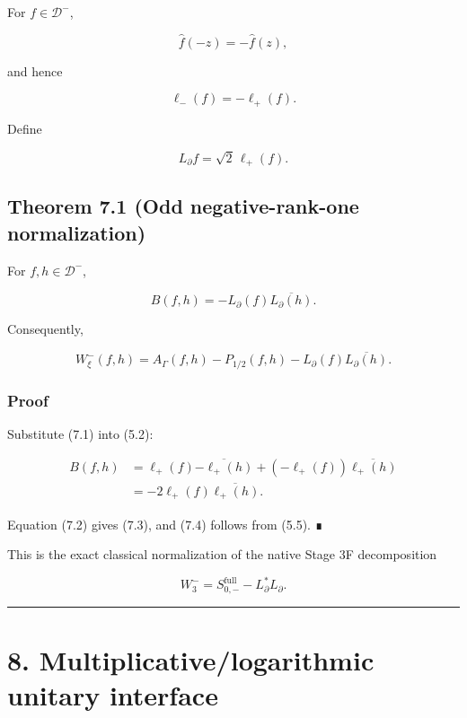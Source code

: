 For \(f\in\mathcal D^-\),

\[
\widehat f(-z)=-\widehat f(z),
\]

and hence

\[
\ell_-(f)=-\ell_+(f).
\tag{7.1}
\]

Define

\[
L_\partial f=\sqrt2\,\ell_+(f).
\tag{7.2}
\]

\hypertarget{theorem-7.1-odd-negative-rank-one-normalization}{%
\subsection{Theorem 7.1 (Odd negative-rank-one normalization)}\label{theorem-7.1-odd-negative-rank-one-normalization}}

For \(f,h\in\mathcal D^-\),

\[
\boxed{
B(f,h)
=-L_\partial(f)\overline{L_\partial(h)}.
}
\tag{7.3}
\]

Consequently,

\[
\boxed{
W_\xi^-(f,h)
=
A_\Gamma(f,h)-P_{1/2}(f,h)
-L_\partial(f)\overline{L_\partial(h)}.
}
\tag{7.4}
\]

\hypertarget{proof-2}{%
\subsubsection{Proof}\label{proof-2}}

Substitute (7.1) into (5.2):

\[
\begin{aligned}
B(f,h)
&=\ell_+(f)\overline{-\ell_+(h)}
+(-\ell_+(f))\overline{\ell_+(h)}\\
&=-2\ell_+(f)\overline{\ell_+(h)}.
\end{aligned}
\]

Equation (7.2) gives (7.3), and (7.4) follows from (5.5). ∎

This is the exact classical normalization of the native Stage 3F decomposition

\[
W_3^-=S_{0,-}^{\mathrm{full}}-L_\partial^*L_\partial.
\]

\begin{center}\rule{0.5\linewidth}{0.5pt}\end{center}

\hypertarget{multiplicativelogarithmic-unitary-interface}{%
\section{8. Multiplicative/logarithmic unitary interface}\label{multiplicativelogarithmic-unitary-interface}}


